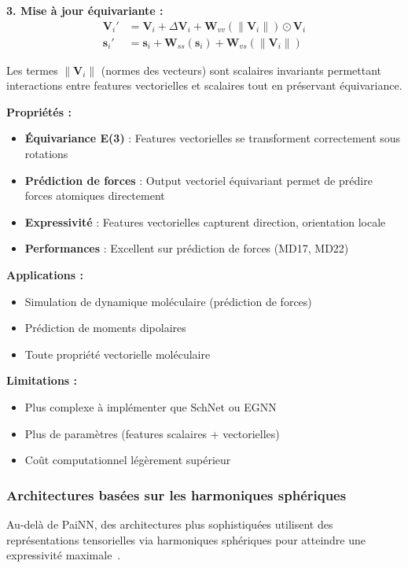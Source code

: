 \textbf{3. Mise à jour équivariante :}
\begin{align*}
\mathbf{V}_i' &= \mathbf{V}_i + \Delta \mathbf{V}_i + \mathbf{W}_{vv}(\|\mathbf{V}_i\|) \odot \mathbf{V}_i \\
\mathbf{s}_i' &= \mathbf{s}_i + \mathbf{W}_{ss}(\mathbf{s}_i) + \mathbf{W}_{vs}(\|\mathbf{V}_i\|)
\end{align*}

Les termes $\|\mathbf{V}_i\|$ (normes des vecteurs) sont scalaires invariants permettant interactions entre features vectorielles et scalaires tout en préservant équivariance.

\textbf{Propriétés :}
\begin{itemize}
    \item \textbf{Équivariance E(3)} : Features vectorielles se transforment correctement sous rotations
    \item \textbf{Prédiction de forces} : Output vectoriel équivariant permet de prédire forces atomiques directement
    \item \textbf{Expressivité} : Features vectorielles capturent direction, orientation locale
    \item \textbf{Performances} : Excellent sur prédiction de forces (MD17, MD22)
\end{itemize}

\textbf{Applications :}
\begin{itemize}
    \item Simulation de dynamique moléculaire (prédiction de forces)
    \item Prédiction de moments dipolaires
    \item Toute propriété vectorielle moléculaire
\end{itemize}

\textbf{Limitations :}
\begin{itemize}
    \item Plus complexe à implémenter que SchNet ou EGNN
    \item Plus de paramètres (features scalaires + vectorielles)
    \item Coût computationnel légèrement supérieur
\end{itemize}

\subsubsection{Architectures basées sur les harmoniques sphériques}

Au-delà de PaiNN, des architectures plus sophistiquées utilisent des représentations tensorielles via harmoniques sphériques pour atteindre une expressivité maximale~\cite{Duval2024}.

